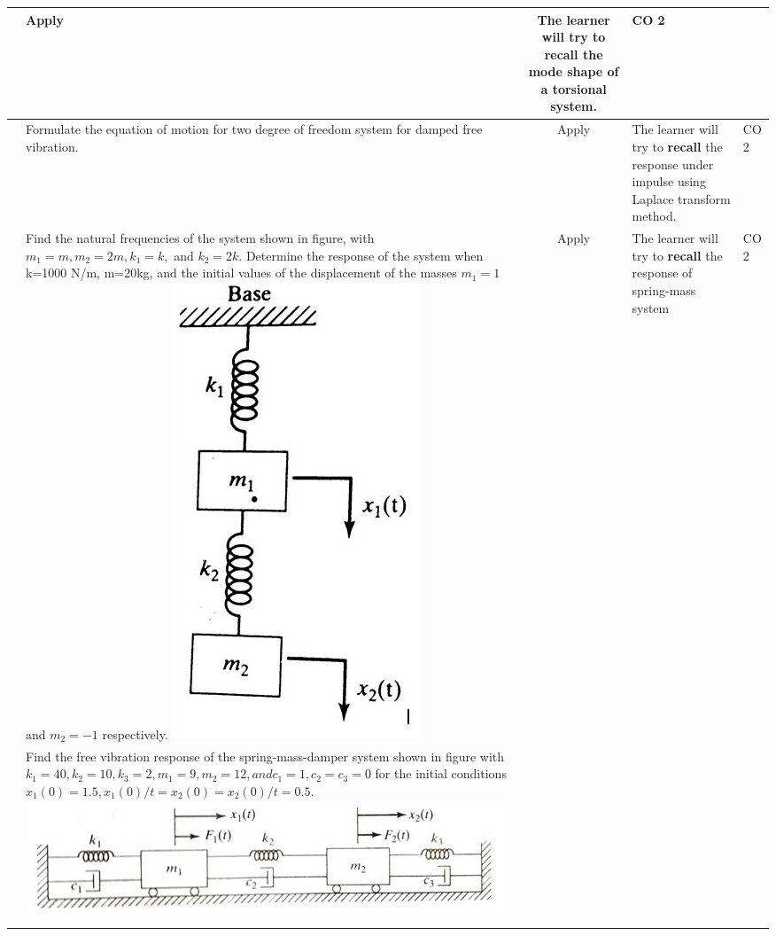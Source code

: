 \documentclass[11pt,paper=a4,answers]{exam}
\begin{document}
\begin{flushleft}
\begin{longtable}{|>{\centering\arraybackslash}p{0.8cm}  | >{\raggedright\arraybackslash}p{6.5cm}  | c | >{\raggedright\arraybackslash}p{5cm} |>{\centering\arraybackslash}p{1cm}|}
&	Apply&	The learner will try to \textbf{recall} the mode shape of a torsional system. &	CO 2\\
	\hline 
	5&	Formulate the equation of motion for two degree of freedom system for damped free
	vibration.
 &	Apply&	The learner will try to \textbf{recall} the response under impulse using Laplace transform method.&	CO 2\\
	\hline 
	6&	Find the natural frequencies of the system shown in figure, with $m_1=m, m_2=2m, k_1=k, $ and $ k_2=2k$. Determine the response of the system when k=1000 N/m, m=20kg, and the initial values of the displacement of the masses $m_1=1 $and $m_2=-1$ respectively.
\includegraphics[scale=0.3]{6.jpg}
&	Apply&	The learner will try to \textbf{recall} the response of spring-mass system&	CO 2\\
	\hline 
7& Find the free vibration response of the spring-mass-damper system shown in figure with $k_1=40, k_2=10, k_3=2, m_1=9, m_2=12, and c_1=1, c_2=c_3=0 $ for the initial conditions $ x_1(0)=1.5, x_1(0)/t=x_2(0)=x_2(0)/t=0.5 $. 
\includegraphics[scale=0.4]{2.jpg}

\end{longtable}
\end{flushleft}
\end{document}

